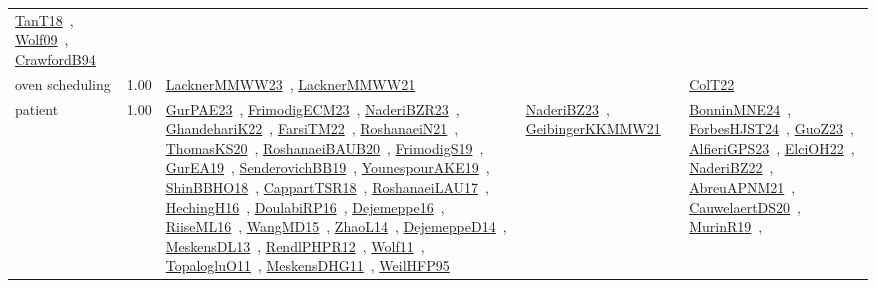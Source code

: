 {\begin{longtable}{p{3cm}r>{\raggedright\arraybackslash}p{6cm}>{\raggedright\arraybackslash}p{6cm}>{\raggedright\arraybackslash}p{8cm}}
\href{../works/TanT18.pdf}{TanT18}~\cite{TanT18}, \href{../works/Wolf09.pdf}{Wolf09}~\cite{Wolf09}, \href{../works/CrawfordB94.pdf}{CrawfordB94}~\cite{CrawfordB94}\\
\index{oven scheduling}\index{ApplicationAreas!oven scheduling}oven scheduling &  1.00 & \href{../works/LacknerMMWW23.pdf}{LacknerMMWW23}~\cite{LacknerMMWW23}, \href{../works/LacknerMMWW21.pdf}{LacknerMMWW21}~\cite{LacknerMMWW21} &  & \href{../works/ColT22.pdf}{ColT22}~\cite{ColT22}\\
\index{patient}\index{ApplicationAreas!patient}patient &  1.00 & \href{../works/GurPAE23.pdf}{GurPAE23}~\cite{GurPAE23}, \href{../works/FrimodigECM23.pdf}{FrimodigECM23}~\cite{FrimodigECM23}, \href{../works/NaderiBZR23.pdf}{NaderiBZR23}~\cite{NaderiBZR23}, \href{../works/GhandehariK22.pdf}{GhandehariK22}~\cite{GhandehariK22}, \href{../works/FarsiTM22.pdf}{FarsiTM22}~\cite{FarsiTM22}, \href{../works/RoshanaeiN21.pdf}{RoshanaeiN21}~\cite{RoshanaeiN21}, \href{../works/ThomasKS20.pdf}{ThomasKS20}~\cite{ThomasKS20}, \href{../works/RoshanaeiBAUB20.pdf}{RoshanaeiBAUB20}~\cite{RoshanaeiBAUB20}, \href{../works/FrimodigS19.pdf}{FrimodigS19}~\cite{FrimodigS19}, \href{../works/GurEA19.pdf}{GurEA19}~\cite{GurEA19}, \href{../works/SenderovichBB19.pdf}{SenderovichBB19}~\cite{SenderovichBB19}, \href{../works/YounespourAKE19.pdf}{YounespourAKE19}~\cite{YounespourAKE19}, \href{../works/ShinBBHO18.pdf}{ShinBBHO18}~\cite{ShinBBHO18}, \href{../works/CappartTSR18.pdf}{CappartTSR18}~\cite{CappartTSR18}, \href{../works/RoshanaeiLAU17.pdf}{RoshanaeiLAU17}~\cite{RoshanaeiLAU17}, \href{../works/HechingH16.pdf}{HechingH16}~\cite{HechingH16}, \href{../works/DoulabiRP16.pdf}{DoulabiRP16}~\cite{DoulabiRP16}, \href{../works/Dejemeppe16.pdf}{Dejemeppe16}~\cite{Dejemeppe16}, \href{../works/RiiseML16.pdf}{RiiseML16}~\cite{RiiseML16}, \href{../works/WangMD15.pdf}{WangMD15}~\cite{WangMD15}, \href{../works/ZhaoL14.pdf}{ZhaoL14}~\cite{ZhaoL14}, \href{../works/DejemeppeD14.pdf}{DejemeppeD14}~\cite{DejemeppeD14}, \href{../works/MeskensDL13.pdf}{MeskensDL13}~\cite{MeskensDL13}, \href{../works/RendlPHPR12.pdf}{RendlPHPR12}~\cite{RendlPHPR12}, \href{../works/Wolf11.pdf}{Wolf11}~\cite{Wolf11}, \href{../works/TopalogluO11.pdf}{TopalogluO11}~\cite{TopalogluO11}, \href{../works/MeskensDHG11.pdf}{MeskensDHG11}~\cite{MeskensDHG11}, \href{../works/WeilHFP95.pdf}{WeilHFP95}~\cite{WeilHFP95} & \href{../works/NaderiBZ23.pdf}{NaderiBZ23}~\cite{NaderiBZ23}, \href{../works/GeibingerKKMMW21.pdf}{GeibingerKKMMW21}~\cite{GeibingerKKMMW21} & \href{../works/BonninMNE24.pdf}{BonninMNE24}~\cite{BonninMNE24}, \href{../works/ForbesHJST24.pdf}{ForbesHJST24}~\cite{ForbesHJST24}, \href{../works/GuoZ23.pdf}{GuoZ23}~\cite{GuoZ23}, \href{../works/AlfieriGPS23.pdf}{AlfieriGPS23}~\cite{AlfieriGPS23}, \href{../works/ElciOH22.pdf}{ElciOH22}~\cite{ElciOH22}, \href{../works/NaderiBZ22.pdf}{NaderiBZ22}~\cite{NaderiBZ22}, \href{../works/AbreuAPNM21.pdf}{AbreuAPNM21}~\cite{AbreuAPNM21}, \href{../works/CauwelaertDS20.pdf}{CauwelaertDS20}~\cite{CauwelaertDS20}, \href{../works/MurinR19.pdf}{MurinR19}~\cite{MurinR19}, 
\end{longtable}}

